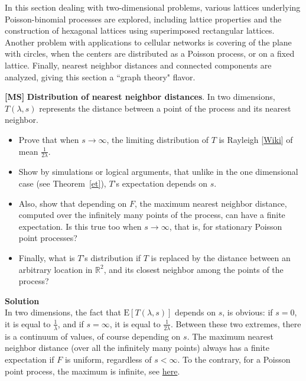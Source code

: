 \documentclass[10pt]{article}
\begin{document}
In this section dealing with two-dimensional problems, various lattices underlying Poisson-binomial processes are explored, including lattice properties and the construction of hexagonal lattices using superimposed rectangular lattices. Another problem with applications to cellular networks is covering of the
plane with circles, when the centers are distributed as a Poisson process, or on a fixed lattice.  Finally, nearest neighbor distances and
connected components are analyzed, giving this section a ``graph theory" flavor.

\begin{Exercise}\label{exercise14b}{\bf [MS]}
{\bf Distribution of nearest neighbor distances}.  In two dimensions, $T(\lambda,s)$ represents the distance between a point of the process and its \textcolor{index}{nearest neighbor}.
\begin{itemize}
\item Prove that when $s\rightarrow\infty$, the limiting distribution of $T$ is \textcolor{index}{Rayleigh} [\href{https://en.wikipedia.org/wiki/Rayleigh_distribution}{Wiki}] of mean $\frac{1}{2\lambda}$.
\item Show by simulations or logical arguments, that unlike in the one dimensional case (see Theorem~\ref{et}), $T$'s expectation depends on $s$.
\item Also, show that depending on $F$, the maximum \textcolor{index}{nearest neighbor distance}, computed over the infinitely many points of the process, can have a finite expectation. Is this true too when $s\rightarrow\infty$, that is, for stationary Poisson point processes?
\item Finally, what is $T$'s distribution if $T$ is replaced by the distance between an arbitrary location in $\mathbb{R}^2$, and its closest neighbor among the points
of the process?
\end{itemize}
{\bf Solution} \nopagebreak \vspace{1ex}   \\
In two dimensions, the fact that $\mbox{E}[T(\lambda,s)]$ depends on $s$, is obvious: if $s=0$, it is equal to $\frac{1}{\lambda}$, and if $s=\infty$, it is equal to $\frac{1}{2\lambda}$. Between these two extremes, there is a continuum of values, of course depending on $s$. The maximum nearest neighbor distance (over all the infinitely many points) always has a finite expectation if $F$ is uniform, regardless of $s<\infty$. To the contrary, for a Poisson point process, the maximum is infinite, see \href{https://mathoverflow.net/questions/412891/maximum-nearest-neighbor-distance-for-a-poisson-point-process/412895#412895}{here}. \vspace{1ex} \\

\end{Exercise}
\end{document}

